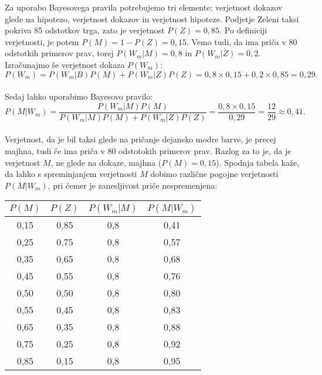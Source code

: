 \documentclass[12pt,a4paper]{amsart}
\theoremstyle{definition} %
\theoremstyle{plain} %
\begin{document}
Za uporabo Bayesovega pravila potrebujemo tri elemente: verjetnost dokazov glede na hipotezo, verjetnost dokazov in verjetnost hipoteze. Podjetje 
Zeleni taksi pokriva 85 odstotkov trga, zato je verjetnost $P(Z)=0,85$. Po definiciji verjetnosti, je potem $P(M)=1-P(Z)=0,15$. Vemo tudi, da ima 
priča v 80 odstotkih primerov prav, torej $P(W_m \lvert M) = 0,8$ in $P(W_m \lvert Z) = 0,2$. Izračunajmo še verjetnost dokaza $P(W_m)$:\\
\[P(W_m) = P(W_m \lvert B)P(M) + P(W_m \lvert Z)P(Z)= 0,8 \times 0,15 + 0,2 \times 0,85 = 0,29.\]\\

Sedaj lahko uporabimo Bayesovo pravilo:
\[P(M \lvert W_m)= \frac{P(W_m \lvert M)P(M)}{P(W_m \lvert M)P(M) + P(W_m \lvert Z)P(Z)} = \frac{0,8 \times 0,15}{0,29} = \frac{12}{29} \approx 0,41.\] \\

Verjetnost, da je bil taksi glede na pričanje dejansko modre barve, je precej majhna, tudi če ima priča v 80 odstotokih primerov prav. Razlog za to je, 
da je verjetnost $M$, ne glede na dokaze, majhna ($P(M)=0,15$). Spodnja tabela kaže, da lahko s spreminjanjem verjetnosti $M$ dobimo različne pogojne 
verjetnosti $P(M \lvert W_m)$, pri čemer je zanesljivost priče nespremenjena:

\begin{table}[h!]
\centering
\begin{tabular}{c c c c} 
\hline
$P(M)$ & $P(Z)$ & $P(W_m \lvert M)$ & $P(M \lvert W_m)$ \\ 
\hline
0,15 & 0,85 & 0,8 & 0,41 \\
0,25 & 0,75 & 0,8 & 0,57 \\
0,35 & 0,65 & 0,8 & 0,68 \\
0,45 & 0,55 & 0,8 & 0,76 \\
0,50 & 0,50 & 0,8 & 0,80 \\
0,55 & 0,45 & 0,8 & 0,83 \\
0,65 & 0,35 & 0,8 & 0,88 \\
0,75 & 0,25 & 0,8 & 0,92 \\
0,85 & 0,15 & 0,8 & 0,95 \\
\hline
\end{tabular} \vspace{3mm}
\end{table}

\end{document}

